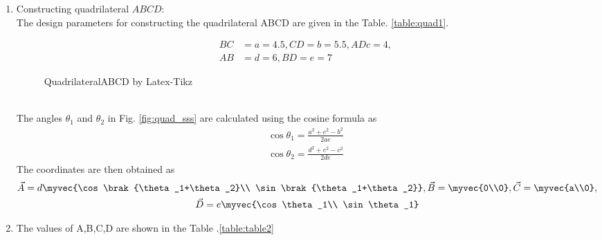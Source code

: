 \renewcommand{\theequation}{\theenumi}
\begin{enumerate}[label=\arabic*.,ref=\thesubsection.\theenumi]

\item Constructing quadrilateral $ABCD$:
\label{const:table1}
\\
\solution  The design parameters for constructing the quadrilateral ABCD are given in the Table. \ref{table:quad1}. 
%
\begin{table}[ht!]
\centering

\caption{Parameters  for Quadrilateral ABCD}
\label{table:quad1}	
\end{table}

\begin{align}
BC &= a = 4.5,  
CD = b = 5.5, 
AD c = 4,
\\  
AB &= d = 6,
BD = e = 7 
\end{align}
%
\begin{figure}[!ht]
	\begin{center}
			\resizebox{\columnwidth}{!}{}
	\end{center}
	\caption{QuadrilateralABCD by Latex-Tikz}
	\label{fig:quad1}	
\end{figure}
%
\\
\solution The angles $\theta_1$ and $\theta_2$ in Fig. 	\ref{fig:quad_sss}	
are calculated using the cosine formula as
\begin{align}
\label{eq:tri_rot_ang}
\cos \theta_1 = \frac{a^2+e^2-b^2}{2ae}
\\
\cos \theta_2 = \frac{d^2+e^2-c^2}{2de}
\end{align}
%
The coordinates are then obtained as
\begin{multline}
\label{eq:tri_basic_new}
\vec{A} = d\myvec{\cos \brak{\theta_1+\theta_2}\\ \sin \brak{\theta_1+\theta_2}}, \vec{B} = \myvec{0\\0}, \vec{C} = \myvec{a\\0}, 
\\
\vec{D} = e\myvec{\cos \theta_1\\ \sin \theta_1}
\end{multline}
%
\item The values of A,B,C,D are shown in the Table .\ref{table:table2}


\end{enumerate}
